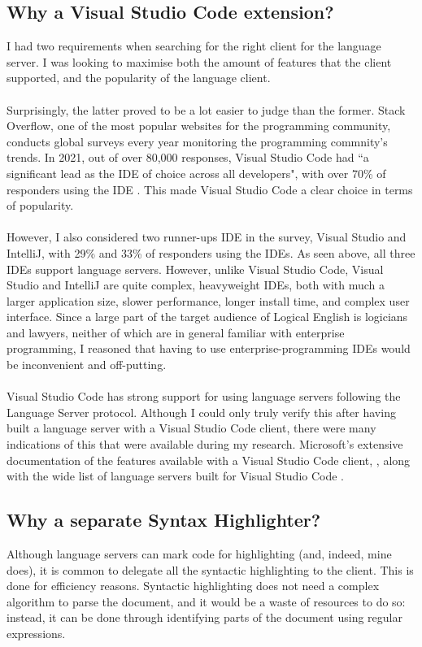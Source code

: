 \documentclass[../main.tex]{subfiles}
\begin{document}
\subsection{Why a Visual Studio Code extension?}
I had two requirements when searching for the right client for the language server. I was looking to maximise both the amount of features that the client supported, and the popularity of the language client. 
\\
\\
Surprisingly, the latter proved to be a lot easier to judge than the former. Stack Overflow, one of the most popular websites for the programming community, conducts global surveys every year monitoring the programming commnity's trends. In 2021, out of over 80,000 responses, Visual Studio Code had ``a significant lead as the IDE of choice across all developers", with over 70\% of responders using the IDE  \cite{ide_rankings}. This made Visual Studio Code a clear choice in terms of popularity. 
\\
\\
However, I also considered two runner-ups IDE in the survey, Visual Studio and IntelliJ, with 29\% and 33\% of responders using the IDEs. As seen above, all three IDEs support language servers. However, unlike Visual Studio Code, Visual Studio and IntelliJ are quite complex, heavyweight IDEs, both with much a larger application size, slower performance, longer install time, and complex user interface. Since a large part of the target audience of Logical English is logicians and lawyers, neither of which are in general familiar with enterprise programming, I reasoned that having to use enterprise-programming IDEs would be inconvenient and off-putting. 
\\
\\
Visual Studio Code has strong support for using language servers following the Language Server protocol. Although I could only truly verify this after having built a language server with a Visual Studio Code client, there were many indications of this that were available during my research. Microsoft's extensive documentation of the features available with a Visual Studio Code client, \cite{vsc_langserver_features}, along with the wide list of language servers built for Visual Studio Code \cite{open_source_language_servers}. 


\subsection{Why a separate Syntax Highlighter?}
Although language servers can mark code for highlighting (and, indeed, mine does), it is common to delegate all the syntactic highlighting to the client. This is done for efficiency reasons. Syntactic highlighting does not need a complex algorithm to parse the document, and it would be a waste of resources to do so: instead, it can be done through identifying parts of the document using regular expressions. 
%
%
%
\end{document}
